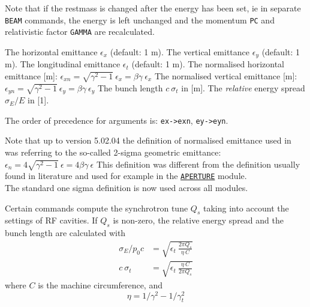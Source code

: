 Note that if the restmass is changed after the energy has been set, ie
in separate \texttt{BEAM} commands, the energy is left unchanged and the momentum
\texttt{PC} and relativistic factor \texttt{GAMMA} are recalculated. 
\\

\begin{madlist}
   The horizontal emittance $\epsilon_x$ (default: 1 m). 
   The vertical emittance $\epsilon_y$ (default: 1 m). 
   The longitudinal emittance $\epsilon_t$ (default: 1 m). 
   The normalised horizontal emittance [m]:
  $\epsilon_{xn} = \sqrt{\gamma^2 - 1} \ \epsilon_x =  \beta \gamma\ \epsilon_x$
   The normalised vertical emittance [m]:
  $\epsilon_{yn} = \sqrt{\gamma^2 - 1} \ \epsilon_y = \beta \gamma\ \epsilon_y$
   The bunch length $c\ \sigma_t$ in [m].  
   The \emph{relative} energy spread
  $\sigma_E / E$ in [1].  
\end{madlist} 

The order of precedence for arguments is: \texttt{ex->exn}, \texttt{ey->eyn}.

Note that up to version 5.02.04 the definition of normalised emittance used in 
\madx was referring to the so-called 2-sigma geometric emittance:
$\epsilon_{n} = 4 \sqrt{\gamma^2 - 1} \ \epsilon = 4 \beta \gamma\ \epsilon$ 
This definition was different from the definition usually found in literature 
and used for example in the \hyperref[chap:aperture]{\texttt{APERTURE}} module.\\
The standard one sigma definition is now used across all \madx modules. 

Certain commands compute the synchrotron tune $Q_s$ taking into account
the settings of RF cavities. 
If $Q_s$ is non-zero, the relative energy spread and 
the bunch length are calculated with
\begin{align}
    \sigma_E / p_0 c  &=  \sqrt{\epsilon_t\ \frac{2 \pi Q_s}{\eta\ C}} \\
          c\ \sigma_t &= \sqrt{\epsilon_t\ \frac{\eta\ C}{2 \pi Q_s}}
\end{align}
where $C$ is the machine circumference, and 
\begin{equation}
  \eta = 1/\gamma^2 - 1/\gamma_t^2  
\end{equation}

